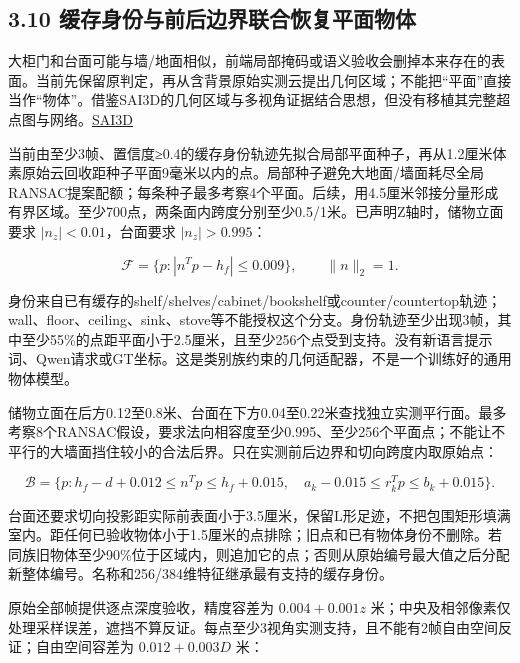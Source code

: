 \documentclass[UTF8,fontset=fandol]{ctexart}
\begin{document}
\subsection*{3.10 缓存身份与前后边界联合恢复平面物体}

大柜门和台面可能与墙/地面相似，前端局部掩码或语义验收会删掉本来存在的表面。当前先保留原判定，再从含背景原始实测云提出几何区域；不能把“平面”直接当作“物体”。借鉴SAI3D的几何区域与多视角证据结合思想，但没有移植其完整超点图与网络。\href{https://arxiv.org/html/2312.11557v2}{SAI3D}



当前由至少3帧、置信度≥0.4的缓存身份轨迹先拟合局部平面种子，再从1.2厘米体素原始云回收距种子平面9毫米以内的点。局部种子避免大地面/墙面耗尽全局RANSAC提案配额；每条种子最多考察4个平面。后续，用4.5厘米邻接分量形成有界区域。至少700点，两条面内跨度分别至少0.5/1米。已声明Z轴时，储物立面要求 $|n_z|<0.01$，台面要求 $|n_z|>0.995$：



\[
\mathcal F=\{p:|n^Tp-h_f|\le0.009\},\qquad \|n\|_2=1.
\]

身份来自已有缓存的shelf/shelves/cabinet/bookshelf或counter/countertop轨迹；wall、floor、ceiling、sink、stove等不能授权这个分支。身份轨迹至少出现3帧，其中至少55\%的点距平面小于2.5厘米，且至少256个点受到支持。没有新语言提示词、Qwen请求或GT坐标。这是类别族约束的几何适配器，不是一个训练好的通用物体模型。



储物立面在后方0.12至0.8米、台面在下方0.04至0.22米查找独立实测平行面。最多考察8个RANSAC假设，要求法向相容度至少0.995、至少256个平面点；不能让不平行的大墙面挡住较小的合法后界。只在实测前后边界和切向跨度内取原始点：



\[
\mathcal B=\{p:h_f-d+0.012\le n^Tp\le h_f+0.015,\quad a_k-0.015\le r_k^Tp\le b_k+0.015\}.
\]

台面还要求切向投影距实际前表面小于3.5厘米，保留L形足迹，不把包围矩形填满室内。距任何已验收物体小于1.5厘米的点排除；旧点和已有物体身份不删除。若同族旧物体至少90\%位于区域内，则追加它的点；否则从原始编号最大值之后分配新整体编号。名称和256/384维特征继承最有支持的缓存身份。



原始全部帧提供逐点深度验收，精度容差为 $0.004+0.001z$ 米；中央及相邻像素仅处理采样误差，遮挡不算反证。每点至少3视角实测支持，且不能有2帧自由空间反证；自由空间容差为 $0.012+0.003D$ 米：
\end{document}
